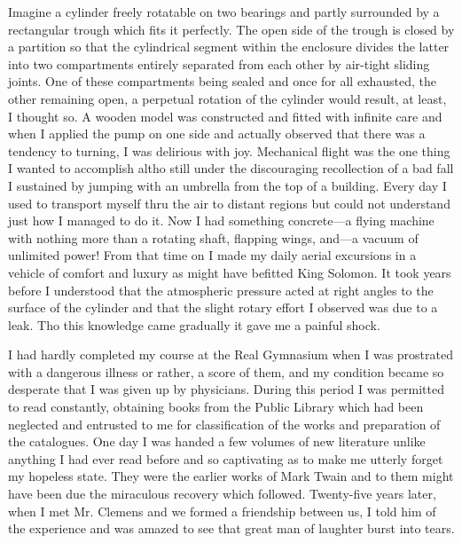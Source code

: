\documentclass[a4paper,12pt,english,twoside,openright]{memoir}
\begin{document}
Imagine a cylinder freely rotatable on two bearings and partly surrounded by a rectangular trough 
which fits it perfectly.  The open side of the trough is closed by a partition so that the cylindrical 
segment within the enclosure divides the latter into two compartments entirely separated from 
each other by air-tight sliding joints.  One of these compartments being sealed and once for all 
exhausted, the other remaining open, a perpetual rotation of the cylinder would result, at least, I 
thought so.  A wooden model was constructed and fitted with infinite care and when I applied the 
pump on one side and actually observed that there was a tendency to turning, I was delirious with 
joy.  Mechanical flight was the one thing I wanted to accomplish altho still under the discouraging 
recollection of a bad fall I sustained by jumping with an umbrella from the top of a building.  Every 
day I used to transport myself thru the air to distant regions but could not understand just how I 
managed to do it.  Now I had something concrete—a flying machine with nothing more than a 
rotating shaft, flapping wings, and—a vacuum of unlimited power! From that time on I made my 
daily aerial excursions in a vehicle of comfort and luxury as might have befitted King Solomon.  It 
took years before I understood that the atmospheric pressure acted at right angles to the surface 
of the cylinder and that the slight rotary effort I observed was due to a leak.  Tho this knowledge 
came gradually it gave me a painful shock.  

I had hardly completed my course at the Real Gymnasium when I was prostrated with a 
dangerous illness or rather, a score of them, and my condition became so desperate that I was 
given up by physicians.  During this period I was permitted to read constantly, obtaining books 
from the Public Library which had been neglected and entrusted to me for classification of the 
works and preparation of the catalogues.  One day I was handed a few volumes of new literature 
unlike anything I had ever read before and so captivating as to make me utterly forget my 
hopeless state.  They were the earlier works of Mark Twain and to them might have been due the 
miraculous recovery which followed.  Twenty-five years later, when I met Mr. Clemens and we 
formed a friendship between us, I told him of the experience and was amazed to see that great 
man of laughter burst into tears.  
\end{document}
